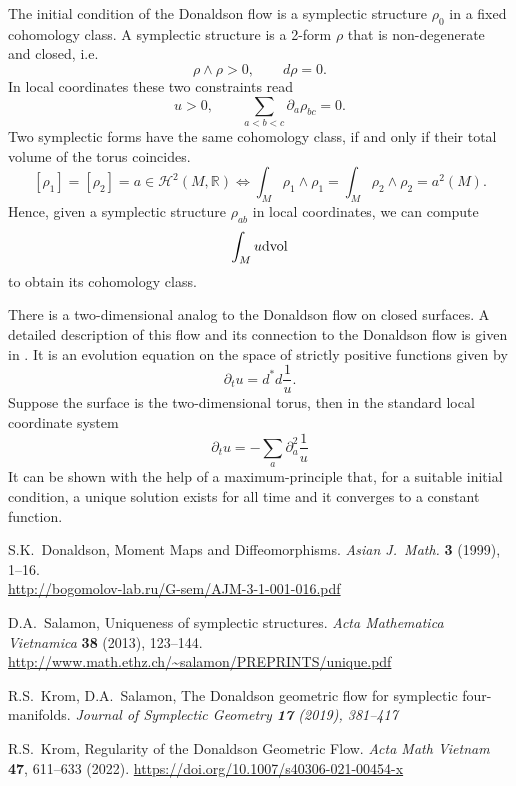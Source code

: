 \documentclass[a4paper]{article}
\newcommand{\R}{{\mathbb R}}
\newcommand{\cH}{{\mathcal H}}
\newcommand{\dvol}{{\rm dvol}}
\newcommand{\p}{{\partial}}
\begin{document}
The initial condition of the Donaldson flow is a symplectic structure $\rho_0$
in a fixed cohomology class. A symplectic structure is a 2-form $\rho$ that is
non-degenerate and closed, i.e.
$$
\rho\wedge \rho > 0, \qquad d\rho = 0.
$$
In local coordinates these two constraints read
$$
u > 0, \qquad \sum_{a < b < c} \partial_a \rho_{bc} = 0.
$$
Two symplectic forms have the same cohomology class, if and only if their total volume of the torus coincides.
$$
[\rho_1] = [\rho_2] = a \in \cH^2(M, \R) \Leftrightarrow \int_M \rho_1\wedge\rho_1 = \int_M \rho_2 \wedge \rho_2 = a^2(M). 
$$
Hence, given a symplectic structure $\rho_{ab}$ in local coordinates, we can compute
$$
\int_M u \dvol
$$
to obtain its cohomology class.

There is a two-dimensional analog to the Donaldson flow on closed surfaces. A detailed description of this flow and its connection to the Donaldson flow is given in \cite{SAL}. It is an evolution equation on the space of strictly positive functions given by
$$
\p_t u = d^*d \frac{1}{u}.
$$
Suppose the surface is the two-dimensional torus, then in the standard local coordinate system
$$
\p_t u = -\sum_a \p_a^2 \frac{1}{u}
$$
It can be shown with the help of a maximum-principle that, for a suitable
initial condition, a unique solution exists for all time and it converges to a
constant function.

\begin{thebibliography}{99}

\scriptsize
\vspace{-7pt}

S.K.~Donaldson, 
Moment Maps and Diffeomorphisms.
{\it Asian J.\ Math.} {\bf 3} (1999), 1--16. \\
\url{http://bogomolov-lab.ru/G-sem/AJM-3-1-001-016.pdf}

\vspace{-7pt}

D.A.~Salamon, Uniqueness of symplectic structures.
{\it Acta Mathematica Vietnamica} {\bf 38} (2013), 123--144. 
\url{http://www.math.ethz.ch/~salamon/PREPRINTS/unique.pdf}

\vspace{-7pt}

R.S.~Krom, D.A.~Salamon, The Donaldson geometric flow for symplectic
four-manifolds.
{\it Journal of Symplectic Geometry {\bf 17} (2019), 381--417}

\vspace{-7pt}

R.S.~Krom, Regularity of the Donaldson Geometric Flow. {\it Acta Math Vietnam} {\bf 47},
611–633 (2022). \url{https://doi.org/10.1007/s40306-021-00454-x}
\end{thebibliography}
\end{document}
